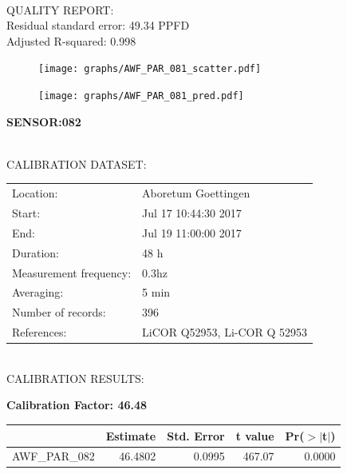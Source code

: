 \documentclass[oneside]{report}
\begin{document}
\hrulefill\\
QUALITY REPORT:\\
Residual standard error: 49.34 PPFD\\
Adjusted R-squared: 0.998



\begin{figure}[H]
  \centering
  \texttt{[image: graphs/AWF\_PAR\_081\_scatter.pdf]}
\end{figure}




\begin{figure}[H]
  \centering
  \texttt{[image: graphs/AWF\_PAR\_081\_pred.pdf]}
\end{figure}

\pagebreak


\begin{center}
\large{\textbf{SENSOR:082}}\\
\end{center}

\hrulefill\\
CALIBRATION DATASET:\\
\begin{table}[h!]
  \centering
  \label{tab:table1}
  \begin{tabular}{ll}
    Location: & Aboretum Goettingen\\ 
    
    
    Start:  & Jul 17 10:44:30 2017 \\
    End:   & Jul 19 11:00:00 2017\\ 
    Duration: & 48 h\\
    Measurement frequency: & 0.3hz\\
    Averaging:  &5 min\\
    Number of records: & 396 \\
    References: & LiCOR Q52953, Li-COR Q 52953 \\
  \end{tabular}
\end{table}

\hrulefill\\
CALIBRATION RESULTS:\\


\begin{center}
\textbf{\large{Calibration Factor: 46.48}}\\
\end{center}
\begin{table}[ht]
\centering
\begin{tabular}{rrrrr}
  \hline
 & Estimate & Std. Error & t value & Pr($>$$|$t$|$) \\ 
  \hline
AWF\_PAR\_082 & 46.4802 & 0.0995 & 467.07 & 0.0000 \\ 
   \hline
\end{tabular}
\end{table}
\end{document}

